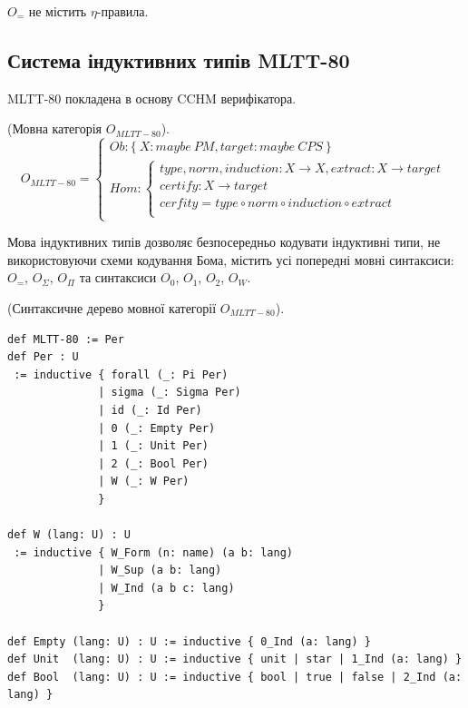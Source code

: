 $O_=$ не містить $\eta$-правила.

\newpage
\subsection{Система індуктивних типів MLTT-80}

MLTT-80 покладена в основу CCHM верифікатора.

\begin{definition} (Мовна категорія $O_{MLTT-80}$).
\begin{equation}
O_{MLTT-80} =
\begin{cases}
Ob: \{\ X: maybe\ PM, target: maybe\ CPS\ \} \\
Hom: \begin{cases}
type,norm,induction: X \rightarrow X, extract: X \rightarrow target \\
certify : X \rightarrow target \\
cerfity = type \circ norm \circ induction \circ extract \\
\end{cases}
\end{cases}
\end{equation}
\end{definition}

Мова індуктивних типів дозволяє безпосередньо кодувати індуктивні типи,
не використовуючи схеми кодування Бома, містить усі попередні мовні синтаксиси:
$O_=$, $O_\Sigma$, $O_\Pi$ та синтаксиси $O_0$, $O_1$, $O_2$, $O_W$.

\begin{definition} (Синтаксичне дерево мовної категорії $O_{MLTT-80}$).
\begin{lstlisting}[mathescape=true]
def MLTT-80 := Per
def Per : U
 := inductive { forall (_: Pi Per)
              | sigma (_: Sigma Per)
              | id (_: Id Per)
              | 0 (_: Empty Per)
              | 1 (_: Unit Per)
              | 2 (_: Bool Per)
              | W (_: W Per)
              }

def W (lang: U) : U
 := inductive { W_Form (n: name) (a b: lang)
              | W_Sup (a b: lang)
              | W_Ind (a b c: lang)
              }

def Empty (lang: U) : U := inductive { 0_Ind (a: lang) }
def Unit  (lang: U) : U := inductive { unit | star | 1_Ind (a: lang) }
def Bool  (lang: U) : U := inductive { bool | true | false | 2_Ind (a: lang) }

\end{lstlisting}
\end{definition}

